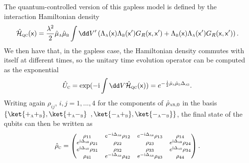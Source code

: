 \documentclass[letterpaper,12pt,titlepage,oneside,final]{book}
\newcommand{\mf}{\mathsf}%
\newcommand{\ii}{\mathrm{i}}
\newcommand{\tc}[1]{\textsc{#1}}
\begin{document}
The quantum-controlled version of this gapless model is defined by the interaction Hamiltonian density
\begin{equation}
    \hat{\mathcal{H}}_\tc{qc}(\mf x) = \frac{\lambda^2}{2} \hat{\mu}_\tc{a} \hat{\mu}_\tc{b} \int \dd V'  \left(\Lambda_\tc{a}(\mf x)\Lambda_\tc{b}(\mf x') G_R(\mf x, \mf x') + \Lambda_\tc{b}(\mf x)\Lambda_\tc{a}(\mf x') G_R(\mf x, \mf x')\right).
\end{equation}
We then have that, in the gapless case, the Hamiltonian density commutes with itself at different times, so the unitary time evolution operator can be computed as the exponential
\begin{equation}
    \hat{U}_\tc{c} = \exp(-\ii \int \dd V\hat{\mathcal{H}}_\tc{qc}(\mf x) ) =  e^{- \frac{\ii}{2} \hat{\mu}_\tc{a}\hat{\mu}_\tc{b}\Delta_{\tc{ab}}}.
\end{equation}
Writing again $\rho_{ij}$, $i,j = 1,...,4$ for the components of $\hat{\rho}_{\tc{ab},0}$ in the basis $\{\ket{+_\tc{a}+_\tc{b}},\ket{+_\tc{a}-_\tc{b}}$ $,\ket{-_\tc{a}+_\tc{b}},\ket{-_\tc{a}-_\tc{b}}\}$, the final state of the qubits can then be written as
\begin{equation}\label{eq:rhoABgaplessQC}
{\footnotesize
    \hat{\rho}_\tc{c} = \begin{pmatrix}
        \rho_{11} & e^{ - \ii\Delta_{\tc{ab}}}\rho_{12} & e^{-\ii\Delta_{\tc{ab}}}\rho_{13} & \rho_{14} \\
        e^{\ii\Delta_{\tc{ab}}}\rho_{21} & \rho_{22} & \rho_{23} & e^{\ii\Delta_{\tc{ab}}}\rho_{24} \\
        e^{\ii\Delta_{\tc{ab}}}\rho_{31} & \rho_{32} & \rho_{33} & e^{\ii\Delta_{\tc{ab}}}\rho_{34} \\
        \rho_{41} & e^{-\ii \Delta_{\tc{ab}}}\rho_{42} & e^{- \ii\Delta_{\tc{ab}}}\rho_{43} & \rho_{44} 
    \end{pmatrix}.}
\end{equation}
\end{document}
